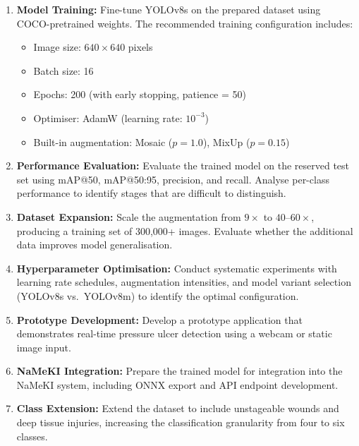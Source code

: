 \documentclass[a4paper,12pt,twoside]{report}
\begin{document}
\begin{enumerate}
  \item \textbf{Model Training:} Fine-tune YOLOv8s on the prepared dataset using
    COCO-pretrained weights. The recommended training configuration includes:
    \begin{itemize}
      \item Image size: $640 \times 640$ pixels
      \item Batch size: 16
      \item Epochs: 200 (with early stopping, patience = 50)
      \item Optimiser: AdamW (learning rate: $10^{-3}$)
      \item Built-in augmentation: Mosaic ($p = 1.0$), MixUp ($p = 0.15$)
    \end{itemize}

  \item \textbf{Performance Evaluation:} Evaluate the trained model on the
    reserved test set using mAP@50, mAP@50:95, precision, and recall. Analyse
    per-class performance to identify stages that are difficult to distinguish.

  \item \textbf{Dataset Expansion:} Scale the augmentation from $9\times$ to
    $40$--$60\times$, producing a training set of 300,000+ images. Evaluate
    whether the additional data improves model generalisation.

  \item \textbf{Hyperparameter Optimisation:} Conduct systematic experiments
    with learning rate schedules, augmentation intensities, and model variant
    selection (YOLOv8s vs.\ YOLOv8m) to identify the optimal configuration.

  \item \textbf{Prototype Development:} Develop a prototype application that
    demonstrates real-time pressure ulcer detection using a webcam or static
    image input.

  \item \textbf{NaMeKI Integration:} Prepare the trained model for integration
    into the NaMeKI system, including ONNX export and API endpoint development.

  \item \textbf{Class Extension:} Extend the dataset to include unstageable
    wounds and deep tissue injuries, increasing the classification granularity
    from four to six classes.
\end{enumerate}
\end{document}
